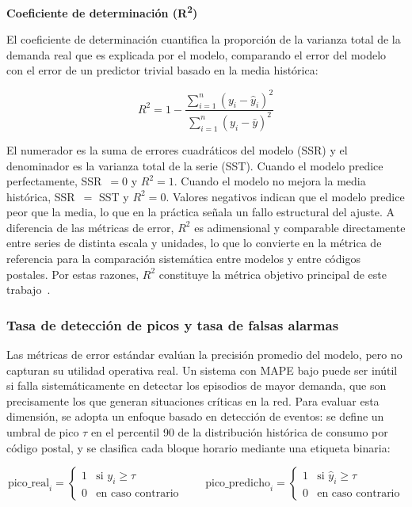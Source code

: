 \documentclass[12pt, a4paper]{article}
\begin{document}
\textbf{Coeficiente de determinación (R\textsuperscript{2})}

El coeficiente de determinación cuantifica la proporción de la varianza total de la demanda real que es explicada por el modelo, comparando el error del modelo con el error de un predictor trivial basado en la media histórica:

\begin{equation}
R^2 = 1 - \frac{\sum_{i=1}^{n}(y_i - \hat{y}_i)^2}{\sum_{i=1}^{n}(y_i - \bar{y})^2}
\end{equation}

El numerador es la suma de errores cuadráticos del modelo (SSR) y el denominador es la varianza total de la serie (SST). Cuando el modelo predice perfectamente, SSR~$= 0$ y $R^2 = 1$. Cuando el modelo no mejora la media histórica, SSR~$=$ SST y $R^2 = 0$. Valores negativos indican que el modelo predice peor que la media, lo que en la práctica señala un fallo estructural del ajuste. A diferencia de las métricas de error, $R^2$ es adimensional y comparable directamente entre series de distinta escala y unidades, lo que lo convierte en la métrica de referencia para la comparación sistemática entre modelos y entre códigos postales. Por estas razones, $R^2$ constituye la métrica objetivo principal de este trabajo~\cite{gassar2024, rubattu2023}.

\subsubsection{Tasa de detección de picos y tasa de falsas alarmas}

Las métricas de error estándar evalúan la precisión promedio del modelo, pero no capturan su utilidad operativa real. Un sistema con MAPE bajo puede ser inútil si falla sistemáticamente en detectar los episodios de mayor demanda, que son precisamente los que generan situaciones críticas en la red. Para evaluar esta dimensión, se adopta un enfoque basado en detección de eventos: se define un umbral de pico $\tau$ en el percentil 90 de la distribución histórica de consumo por código postal, y se clasifica cada bloque horario mediante una etiqueta binaria:

\begin{equation}
\text{pico\_real}_i = \begin{cases} 1 & \text{si } y_i \geq \tau \\ 0 & \text{en caso contrario} \end{cases} \qquad \text{pico\_predicho}_i = \begin{cases} 1 & \text{si } \hat{y}_i \geq \tau \\ 0 & \text{en caso contrario} \end{cases}
\end{equation}
\end{document}
